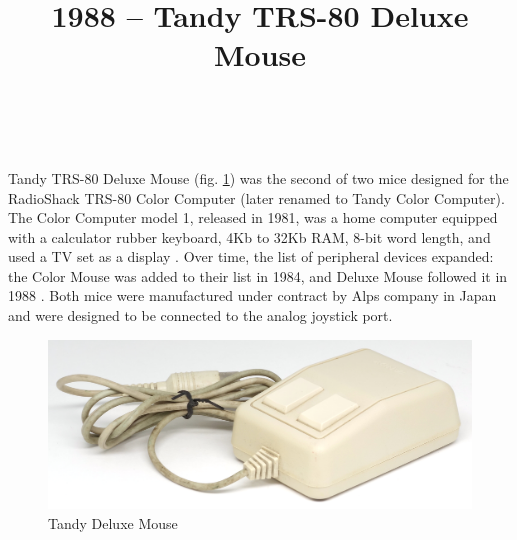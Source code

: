 \documentclass[11pt, a4paper]{article}
\begin{document}
\title{1988 -- Tandy TRS-80 Deluxe Mouse}
\date{}
\author{~}
\maketitle
{}

Tandy TRS-80 Deluxe Mouse (fig. \ref{fig:TandyDeluxeMousePic}) was the second of two mice designed for the RadioShack TRS-80 Color Computer (later renamed to Tandy Color Computer). The Color Computer model 1, released in 1981, was a home computer equipped with a calculator rubber keyboard, 4Kb to 32Kb RAM, 8-bit word length, and used a TV set as a display \cite{wiki}. Over time, the list of peripheral devices expanded: the Color Mouse was added to their list in 1984, and Deluxe Mouse followed it in 1988 \cite{adv}. Both mice were manufactured under contract by Alps company in Japan and were designed to be connected to the analog joystick port.

\begin{figure}[h]
   \centering
\includegraphics[scale=0.7]{1988_tandy_trs80_deluxe_mouse/pic_30.jpg}
    \caption{Tandy Deluxe Mouse}
    \label{fig:TandyDeluxeMousePic}
\end{figure}
\end{document}
